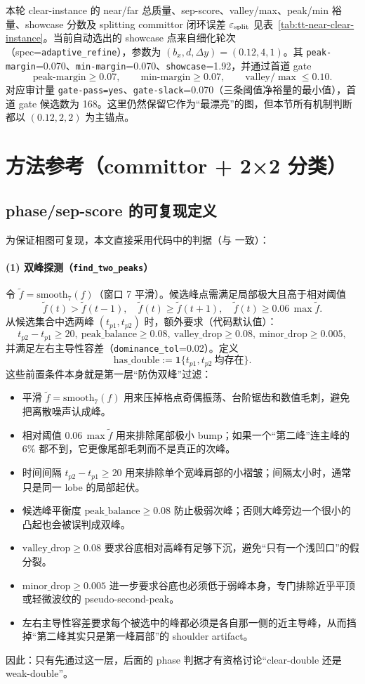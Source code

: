 \documentclass[11pt,fontset=fandol]{ctexart}
\begin{document}
本轮 clear-instance 的 near/far 总质量、sep-score、valley/max、peak/min 裕量、showcase 分数及 splitting committor 闭环误差 $\varepsilon_{\rm split}$ 见表~\ref{tab:tt-near-clear-instance}。当前自动选出的 showcase 点来自细化轮次（spec=\texttt{adaptive\_refine}），参数为 $(b_x,d,\Delta y)=(0.12,4,1)$。其 \texttt{peak-margin}=0.070、\texttt{min-margin}=0.070、\texttt{showcase}=1.92，并通过首道 gate
\[
\mathrm{peak\mbox{-}margin}\ge 0.07,\qquad
\mathrm{min\mbox{-}margin}\ge 0.07,\qquad
\mathrm{valley}/\max\le 0.10.
\]
对应审计量 \texttt{gate-pass=yes}、\texttt{gate-slack}=0.070（三条阈值净裕量的最小值），首道 gate 候选数为 168。这里仍然保留它作为“最漂亮”的图，但本节所有机制判断都以 $(0.12,2,2)$ 为主锚点。

\section{方法参考（committor + 2×2 分类）}
\subsection*{phase/sep-score 的可复现定义}
为保证相图可复现，本文直接采用代码中的判据（与  一致）：
\paragraph{(1) 双峰探测（\texttt{find\_two\_peaks}）}
令 $\tilde f=\mathrm{smooth}_7(f)$（窗口 7 平滑）。候选峰点需满足局部极大且高于相对阈值
\[
\tilde f(t)>\tilde f(t-1),\quad \tilde f(t)\ge \tilde f(t+1),\quad \tilde f(t)\ge 0.06\,\max \tilde f.
\]
从候选集合中选两峰 $(t_{p1},t_{p2})$ 时，额外要求（代码默认值）：
\[
t_{p2}-t_{p1}\ge 20,\ \mathrm{peak\_balance}\ge 0.08,\ \mathrm{valley\_drop}\ge 0.08,\ \mathrm{minor\_drop}\ge 0.005,
\]
并满足左右主导性容差（\texttt{dominance\_tol}=0.02）。定义
\[
\mathrm{has\_double}:=\mathbf 1\{t_{p1},t_{p2}\ \text{均存在}\}.
\]
这些前置条件本身就是第一层“防伪双峰”过滤：
\begin{itemize}
  \item 平滑 $\tilde f=\mathrm{smooth}_7(f)$ 用来压掉格点奇偶振荡、台阶锯齿和数值毛刺，避免把离散噪声认成峰。
  \item 相对阈值 $0.06\,\max\tilde f$ 用来排除尾部极小 bump；如果一个“第二峰”连主峰的 $6\%$ 都不到，它更像尾部毛刺而不是真正的次峰。
  \item 时间间隔 $t_{p2}-t_{p1}\ge 20$ 用来排除单个宽峰肩部的小褶皱；间隔太小时，通常只是同一 lobe 的局部起伏。
  \item 候选峰平衡度 $\mathrm{peak\_balance}\ge 0.08$ 防止极弱次峰；否则大峰旁边一个很小的凸起也会被误判成双峰。
  \item $\mathrm{valley\_drop}\ge 0.08$ 要求谷底相对高峰有足够下沉，避免“只有一个浅凹口”的假分裂。
  \item $\mathrm{minor\_drop}\ge 0.005$ 进一步要求谷底也必须低于弱峰本身，专门排除近乎平顶或轻微波纹的 pseudo-second-peak。
  \item 左右主导性容差要求每个被选中的峰都必须是各自那一侧的近主导峰，从而挡掉“第二峰其实只是第一峰肩部”的 shoulder artifact。
\end{itemize}
因此：只有先通过这一层，后面的 phase 判据才有资格讨论“clear-double 还是 weak-double”。
\end{document}

